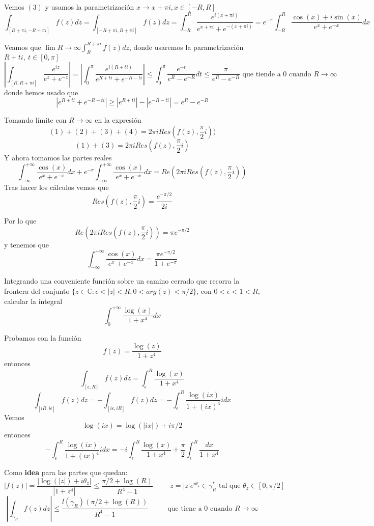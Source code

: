 Vemos $(3)$ y usamos la parametrización $x\rightarrow x+\pi i, x\in[-R,R]$
$$ \int_{[R+\pi i,-R+\pi i]} f(z)dz = \int_{[-R+\pi i,R+\pi i]} f(z)dz = \int_{-R}^{R} \frac{e^{i(x+\pi i)}}{e^{x+\pi i}+e^{-(x+\pi i)}} = e^{-\pi} \int_{-R}^{R} \frac{\cos(x)+i\sin(x)}{e^x+e^{-x}}dx $$

Veamos que $\lim{R\rightarrow\infty} \int_{R}^{R+\pi i} f(z)dz$, donde usaremos la parametrización $R+ti, \ t\in[0,\pi]$
$$ \left| \int_{[R,R+\pi i]} \frac{e^{iz}}{e^z+e^{-z}} \right|  = \left| \int_{0}^{\pi} \frac{e^{i(R+ti)}}{e^{R+ti}+e^{-R-ti}} \right| \leq \int_{0}^{\pi} \frac{e^{-t}}{e^R-e^{-R}}dt \leq \frac{\pi}{e^R-e^{-R}} \text{ que tiende a $0$ cuando $R \rightarrow\infty$}$$
donde hemos usado que
$$ | e^{R+ti}+e^{-R-ti} | \geq |e^{R+ti}|-|e^{-R-ti}| = e^R-e^{-R} $$

Tomando límite con $R\rightarrow\infty$ en la expresión
$$ (1)+(2)+(3)+(4) = 2\pi i Res(f(z),\frac{\pi}{2}i)) $$
$$ (1)+(3) = 2\pi iRes(f(z),\frac{\pi}{2}i) $$
Y ahora tomamos las partes reales
$$ \int_{-\infty}^{+\infty} \frac{\cos(x)}{e^x+e^{-x}} dx + e^{-\pi} \int_{-\infty}^{+\infty} \frac{\cos(x)}{e^x+e^{-x}}dx = Re(2\pi iRes(f(z), \frac{\pi}{2}i)) $$
Tras hacer los cálculos vemos que
$$ Res(f(z),\frac{\pi}{2}i) = \frac{e^{-\pi/2}}{2i}  $$

Por lo que 
$$ Re(2\pi iRes(f(z), \frac{\pi}{2}i)) = \pi e^{-\pi/2} $$
y tenemos que
$$ \int_{-\infty}^{+\infty} \frac{\cos(x)}{e^x+e^{-x}} dx = \frac{\pi e^{-\pi/2}}{1+e^{-\pi}} $$




\begin{ejer}
	Integrando una conveniente función sobre un camino cerrado que recorra la frontera del conjunto $\{ z\in\mathbb{C} : \epsilon < |z| < R, 0<arg(z)<\pi/2 \}$, con $0<\epsilon<1<R$, calcular la integral
	$$ \int_{0}^{+\infty} \frac{\log(x)}{1+x^4}dx $$
\end{ejer}
Probamos con la función
$$ f(z) = \frac{\log(z)}{1+z^4} $$
entonces
$$ \int_{[\epsilon, R]}f(z)dz = \int_{\epsilon}^{R} \frac{\log(x)}{1+x^4} $$
$$ \int_{[iR,i\epsilon]} f(z)dz = -\int_{[i\epsilon,iR]} f(z)dz = -\int_{\epsilon}^{R} \frac{\log(ix)}{1+(ix)^4} idx $$
Vemos
$$ \log(ix) = \log(|ix|)+i\pi/2 $$
entonces
$$ -\int_{\epsilon}^{R} \frac{\log(ix)}{1+(ix)^4} idx = -i\int_{\epsilon}^{R} \frac{\log(x)}{1+x^4} + \frac{\pi}{2} \int_{\epsilon}^{R} \frac{dx}{1+x^4} $$

Como \textbf{idea} para las partes que quedan:
$$ |f(z)| = \frac{|\log(|z|)+i\theta_z|}{|1+z^4|} \leq \frac{\pi/2+\log(R)}{R^4-1} \hspace{1cm} z=|z|e^{i\theta_z} \in\gamma_R^{\ast} \text{ tal que }\theta_z\in[0,\pi/2]$$
$$ \left| \int_{\gamma_R}f(z)dz \right| \leq \frac{l(\gamma_R)(\pi/2+\log(R))}{R^4-1} \hspace{1cm}\text{ que tiene a 0 cuando $R\rightarrow\infty$} $$

